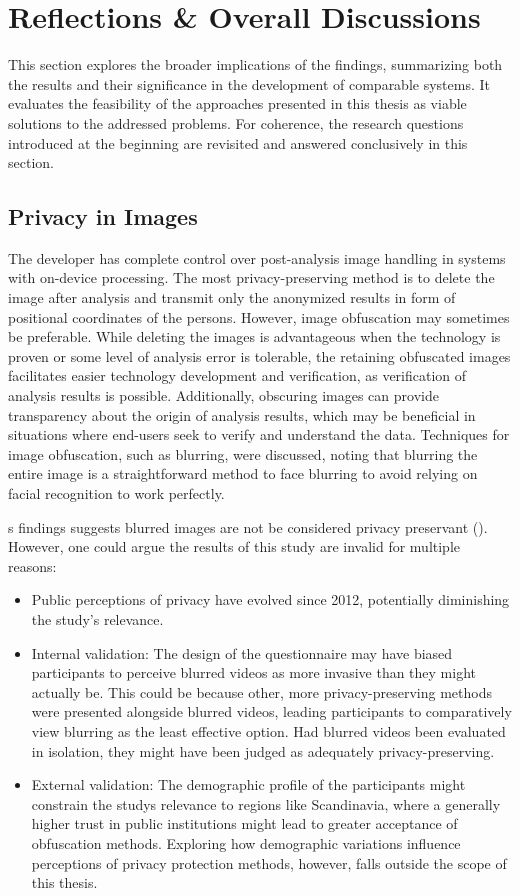 \section{Reflections \& Overall Discussions}
\label{sec:reflections}
This section explores the broader implications of the findings, summarizing both the results and their significance in the development of comparable systems. It evaluates the feasibility of the approaches presented in this thesis as viable solutions to the addressed problems. For coherence, the research questions introduced at the beginning are revisited and answered conclusively in this section.

\subsection{Privacy in Images}
\label{sec:privacy_in_images}
The developer has complete control over post-analysis image handling in systems with on-device processing. The most privacy-preserving method is to delete the image after analysis and transmit only the anonymized results in form of positional coordinates of the persons. However, image obfuscation may sometimes be preferable. While deleting the images is advantageous when the technology is proven or some level of analysis error is tolerable, the retaining obfuscated images facilitates easier technology development and verification, as verification of analysis results is possible. Additionally, obscuring images can provide transparency about the origin of analysis results, which may be beneficial in situations where end-users seek to verify and understand the data. Techniques for image obfuscation, such as blurring, were discussed, noting that blurring the entire image is a straightforward method to face blurring to avoid relying on facial recognition to work perfectly.

\citeauthor{ed2012privacy_review}s findings suggests blurred images are not be considered privacy preservant (\citeyear{ed2012privacy_review}). However, one could argue the results of this study are invalid for multiple reasons: 
\begin{itemize}
    \item Public perceptions of privacy have evolved since 2012, potentially diminishing the study's relevance.
    \item Internal validation: The design of the questionnaire may have biased participants to perceive blurred videos as more invasive than they might actually be. This could be because other, more privacy-preserving methods were presented alongside blurred videos, leading participants to comparatively view blurring as the least effective option. Had blurred videos been evaluated in isolation, they might have been judged as adequately privacy-preserving.
    \item External validation: The demographic profile of the participants might constrain the studys relevance to regions like Scandinavia, where a generally higher trust in public institutions might lead to greater acceptance of obfuscation methods. Exploring how demographic variations influence perceptions of privacy protection methods, however, falls outside the scope of this thesis.
\end{itemize}


